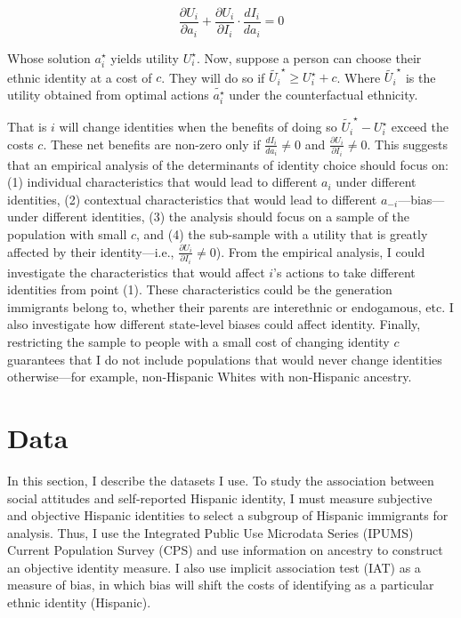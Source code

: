 \documentclass[12pt,english]{article}
\begin{document}
\begin{equation}
\frac{\partial U_i}{\partial a_i} + \frac{\partial U_i}{\partial I_i} \cdot \frac{d I_i}{d a_i} = 0\label{eq:foc}
\end{equation}

Whose solution $a_{i}^{\star}$ yields utility $U_{i}^{\star}$. Now, suppose a person can choose their ethnic identity at a cost of $c$. They will do so if $\tilde{U_{i}}^{\star} \geq  U_{i}^{\star} + c$. Where $\tilde{U_{i}}^{\star}$ is the utility obtained from optimal actions $\tilde{a_i^{\star}}$ under the counterfactual ethnicity. 

That is $i$ will change identities when the benefits of doing so $\tilde{U_{i}}^{\star} - U_{i}^{\star}$ exceed the costs $c$. These net benefits are non-zero only if $\frac{d I_i}{d a_i} \neq 0$ and $\frac{\partial U_i}{\partial I_i} \neq 0$. This suggests that an empirical analysis of the determinants of identity choice should focus on: (1) individual characteristics that would lead to different $a_i$ under different identities, (2) contextual characteristics that would lead to different $a_{-i}$---bias---under different identities, (3) the analysis should focus on a sample of the population with small $c$, and (4) the sub-sample with a utility that is greatly affected by their identity---i.e., $\frac{\partial U_i}{\partial I_i} \neq 0$). From the empirical analysis, I could investigate the characteristics that would affect $i$'s actions to take different identities from point (1). These characteristics could be the generation immigrants belong to, whether their parents are interethnic or endogamous, etc. I also investigate how different state-level biases could affect identity. Finally, restricting the sample to people with a small cost of changing identity $c$ guarantees that I do not include populations that would never change identities otherwise---for example, non-Hispanic Whites with non-Hispanic ancestry.

\section{Data}\label{sec:data}

In this section, I describe the datasets I use. To study the association between social attitudes and self-reported Hispanic identity, I must measure subjective and objective Hispanic identities to select a subgroup of Hispanic immigrants for analysis. Thus, I use the Integrated Public Use Microdata Series (IPUMS) Current Population Survey (CPS) \autocite{floodsarahIntegratedPublicUse2021a} and use information on ancestry to construct an objective identity measure. I also use implicit association test (IAT) as a measure of bias, in which bias will shift the costs of identifying as a particular ethnic identity (Hispanic).
\end{document}
